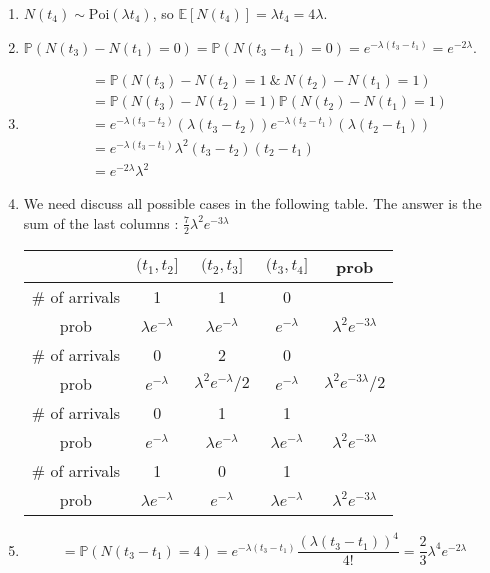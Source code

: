 \documentclass[  11pt]{article}
\newcommand{\Poi}{\mbox{Poi}}
\newcommand{\la}{\lambda}
\begin{document}
\begin{ExerciseList}
\Answer
\begin{enumerate}
\item $N(t_4) \sim \Poi(\lambda t_4)$, so $\mathbb{E}[N(t_4)] = \lambda t_4 = 4\lambda$.

\item $ \mathbb{P}(N(t_3)-N(t_1) = 0) = \mathbb{P}(N(t_3-t_1)=0) = e^{-\lambda (t_3-t_1)} = e^{-2\lambda}$.

\item \[\begin{split}
& = \mathbb{P}(N(t_3)-N(t_2) = 1\ \&\ N(t_2)-N(t_1) = 1 ) \\
& = \mathbb{P}(N(t_3)-N(t_2) = 1)\mathbb{P}(N(t_2)-N(t_1) = 1) \\
& = e^{-\lambda (t_3-t_2)}(\lambda (t_3-t_2)) e^{-\lambda (t_2-t_1)} (\lambda (t_2-t_1))\\
& = e^{-\lambda (t_3-t_1)}\lambda^2(t_3-t_2)(t_2-t_1) \\
& = e^{-2\lambda}\lambda^2
\end{split}\]

\item 
 We need discuss all possible cases in the following table.
  The answer is the sum of the last columns :
 $ \frac72 \lambda^2 e^{-3\lambda} $ 

\begin{center}
  \begin{tabular}{|c|ccc|c|}
\hline 
&$(t_1, t_2]$ & $(t_2, t_3]$ & $(t_3, t_4]$ & \mbox{prob} \\
\hline
\# of arrivals &1 & 1 & 0 & \\
prob &$ \lambda e^{-\lambda}$&$\lambda e^{-\lambda}$&$e^{-\lambda}$&$\lambda^2 e^{-3\lambda}$
\\
\hline
\# of arrivals& 0 & 2 & 0 &  \\
prob &$   e^{-\lambda}$&$\lambda^2 e^{-\lambda}/ 2$
&$e^{-\lambda}$&$\lambda^2 e^{-3\lambda}/ 2$
\\
\hline
\# of arrivals &0 & 1 &  1  &  \\
 prob &$   e^{-\lambda}$&$\lambda e^{-\lambda}$&$\la e^{-\lambda}$&$\lambda^2 e^{-3\lambda}$
\\
\hline
 \# of arrivals&1 & 0 & 1  &   \\
prob &$ \lambda e^{-\lambda}$&$  e^{-\lambda}$&$\la e^{-\lambda}$&$\lambda^2 e^{-3\lambda}$
\\ 
\hline
\end{tabular}
\end{center}

\item $$= \mathbb{P}(N(t_3-t_1) = 4) = e^{-\lambda(t_3-t_1)}\frac{(\lambda (t_3-t_1))^4}{4!} = \frac{2}{3}\lambda^4 e^{-2\lambda}$$


\end{enumerate}
\end{ExerciseList}
\end{document}
